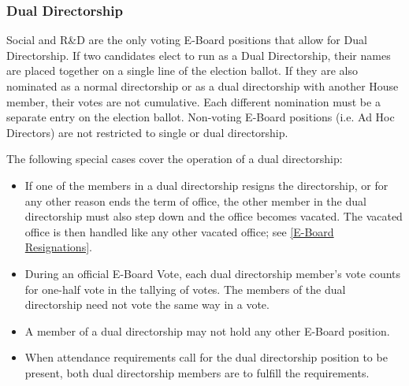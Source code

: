 \documentclass{article}
\newcommand{\asubsection}[1]{\subsubsection{#1} \label{#1}}
\begin{document}
\asubsection{Dual Directorship}
Social and R\&D are the only voting E-Board positions that allow for Dual Directorship.
If two candidates elect to run as a Dual Directorship, their names are placed together on a single line of the election ballot.
If they are also nominated as a normal directorship or as a dual directorship with another House member, their votes are not cumulative.
Each different nomination must be a separate entry on the election ballot.
Non-voting E-Board positions (i.e. Ad Hoc Directors) are not restricted to single or dual directorship.

The following special cases cover the operation of a dual directorship:
\begin{itemize}
	\item If one of the members in a dual directorship resigns the directorship, or for any other reason ends the term of office, the other member in the dual directorship must also step down and the office becomes vacated.
		The vacated office is then handled like any other vacated office; see \ref{E-Board Resignations}.
	\item During an official E-Board Vote, each dual directorship member's vote counts for one-half vote in the tallying of votes.
		The members of the dual directorship need not vote the same way in a vote.
	\item A member of a dual directorship may not hold any other E-Board position.
	\item When attendance requirements call for the dual directorship position to be present, both dual directorship members are to fulfill the requirements.
\end{itemize}
\end{document}
